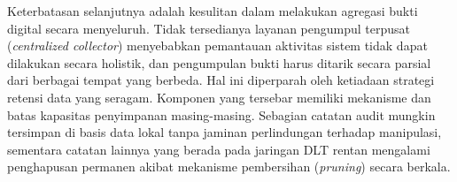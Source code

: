 Keterbatasan selanjutnya adalah kesulitan dalam melakukan agregasi bukti digital secara menyeluruh. Tidak tersedianya layanan pengumpul terpusat (\textit{centralized collector}) menyebabkan pemantauan aktivitas sistem tidak dapat dilakukan secara holistik, dan pengumpulan bukti harus ditarik secara parsial dari berbagai tempat yang berbeda. Hal ini diperparah oleh ketiadaan strategi retensi data yang seragam. Komponen yang tersebar memiliki mekanisme dan batas kapasitas penyimpanan masing-masing. Sebagian catatan audit mungkin tersimpan di basis data lokal tanpa jaminan perlindungan terhadap manipulasi, sementara catatan lainnya yang berada pada jaringan DLT rentan mengalami penghapusan permanen akibat mekanisme pembersihan (\textit{pruning}) secara berkala.